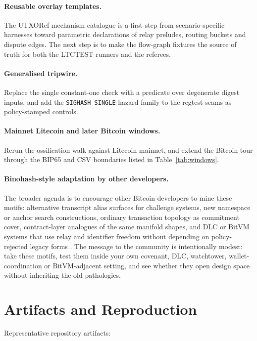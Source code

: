 \documentclass[11pt]{article}
\begin{document}
\paragraph{Reusable overlay templates.} The UTXORef mechanism catalogue is a
first step from scenario-specific harnesses toward parametric declarations of
relay preludes, routing buckets and dispute edges. The next step is to make the
flow-graph fixtures the source of truth for both the LTCTEST runners and the
referees.

\paragraph{Generalised tripwire.} Replace the single constant-one check with a
predicate over degenerate digest inputs, and add the \texttt{SIGHASH\_SINGLE}
hazard family to the regtest seams as policy-stamped controls.

\paragraph{Mainnet Litecoin and later Bitcoin windows.} Rerun the ossification
walk against Litecoin mainnet, and extend the Bitcoin tour through the BIP65
and CSV boundaries listed in Table~\ref{tab:windows}.

\paragraph{Binohash-style adaptation by other developers.} The broader agenda
is to encourage other Bitcoin developers to mine these motifs: alternative
transcript alias surfaces for challenge systems, new namespace or anchor search
constructions, ordinary transaction topology as commitment cover, contract-layer
analogues of the same manifold shapes, and DLC or BitVM systems that use relay
and identifier freedom without depending on policy-rejected legacy forms
\cite{linus2026binohash}. The message to the community is intentionally
modest: take these motifs, test them inside your own covenant, DLC, watchtower,
wallet-coordination or BitVM-adjacent setting, and see whether they open design
space without inheriting the old pathologies.

\section*{Artifacts and Reproduction}

Representative repository artifacts:
\end{document}
